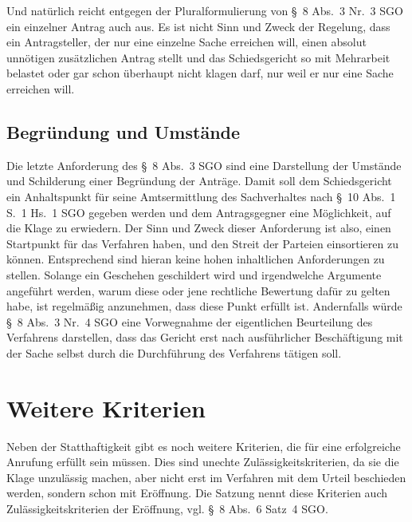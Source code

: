 Und natürlich reicht entgegen der Pluralformulierung von \S~8 Abs.~3 Nr.~3 SGO ein einzelner Antrag auch aus. Es ist nicht Sinn und Zweck der Regelung, dass ein Antragsteller, der nur eine einzelne Sache erreichen will, einen absolut unnötigen zusätzlichen Antrag stellt und das Schiedsgericht so mit Mehrarbeit belastet oder gar schon überhaupt nicht klagen darf, nur weil er nur eine Sache erreichen will.

\subsection{Begründung und Umstände}
\label{Anrufung:Statthaftigkeit:Gruende}
Die letzte Anforderung des \S~8 Abs.~3 SGO sind eine Darstellung der Umstände und Schilderung einer Begründung der Anträge.
Damit soll dem Schiedsgericht ein Anhaltspunkt für seine Amtsermittlung des Sachverhaltes nach \S~10 Abs.~1 S.~1 Hs.~1 SGO gegeben werden und dem Antragsgegner eine Möglichkeit, auf die Klage zu erwiedern.
Der Sinn und Zweck dieser Anforderung ist also, einen Startpunkt für das Verfahren haben, und den Streit der Parteien einsortieren zu können.
Entsprechend sind hieran keine hohen inhaltlichen Anforderungen zu stellen.
Solange ein Geschehen geschildert wird und irgendwelche Argumente angeführt werden, warum diese oder jene rechtliche Bewertung dafür zu gelten habe, ist regelmäßig anzunehmen, dass diese Punkt erfüllt ist.
Andernfalls würde \S~8 Abs.~3 Nr.~4 SGO eine Vorwegnahme der eigentlichen Beurteilung des Verfahrens darstellen, dass das Gericht erst nach ausführlicher Beschäftigung mit der Sache selbst durch die Durchführung des Verfahrens tätigen soll.

\section{Weitere Kriterien}
\label{Anrufung:Kriterien}
Neben der Statthaftigkeit gibt es noch weitere Kriterien, die für eine erfolgreiche Anrufung erfüllt sein müssen.
Dies sind unechte Zulässigkeitskriterien, da sie die Klage unzulässig machen, aber nicht erst im Verfahren mit dem Urteil beschieden werden, sondern schon mit Eröffnung.
Die Satzung nennt diese Kriterien auch Zulässigkeitskriterien der Eröffnung, vgl. \S~8 Abs.~6 Satz~4 SGO.

